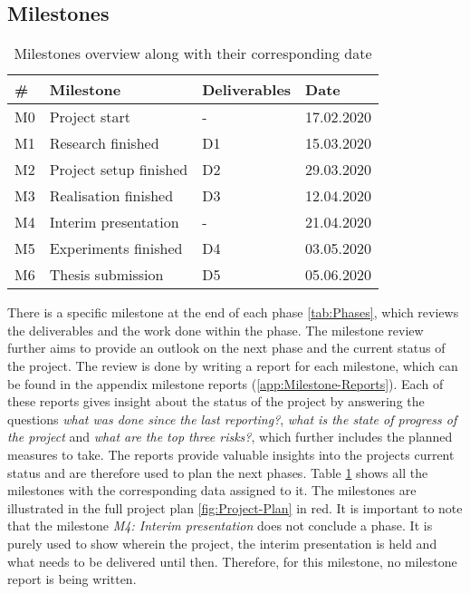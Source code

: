 \subsection{Milestones}
\label{sec:Milestones-Project}
\begin{table}[htb]
    \centering
    \caption{Milestones overview along with their corresponding date}
	\label{tab:Milestones}
    \begin{tabular}{p{} | p{} | p{} | p{}}
        \toprule
        \textbf{\#} & \textbf{Milestone} & \textbf{Deliverables} & \textbf{Date} \\ 
        \midrule[1pt]
        M0 & Project start & - & 17.02.2020\\
        \hline
        M1 & Research finished & D1 & 15.03.2020\\
        \hline
        M2 & Project setup finished & D2 & 29.03.2020\\
        \hline
        M3 & Realisation finished & D3 & 12.04.2020\\
        \hline
        M4 & Interim presentation & - & 21.04.2020\\
        \hline
        M5 & Experiments finished & D4 & 03.05.2020\\
        \hline
        M6 & Thesis submission & D5 & 05.06.2020\\
        \bottomrule
    \end{tabular}
\end{table}
\noindent
There is a specific milestone at the end of each phase \ref{tab:Phases}, which reviews the deliverables and the work done within the phase. The milestone review further aims to provide an outlook on the next phase and the current status of the project. The review is done by writing a report for each milestone, which can be found in the appendix milestone reports (\ref{app:Milestone-Reports}). Each of these reports gives insight about the status of the project by answering the questions \textit{what was done since the last reporting?}, \textit{what is the state of progress of the project} and \textit{what are the top three risks?}, which further includes the planned measures to take. The reports provide valuable insights into the projects current status and are therefore used to plan the next phases. Table \ref{tab:Milestones} shows all the milestones with the corresponding data assigned to it. The milestones are illustrated in the full project plan \ref{fig:Project-Plan} in red.
\newline
\newline
It is important to note that the milestone \textit{M4: Interim presentation} does not conclude a phase. It is purely used to show wherein the project, the interim presentation is held and what needs to be delivered until then. Therefore, for this milestone, no milestone report is being written.

